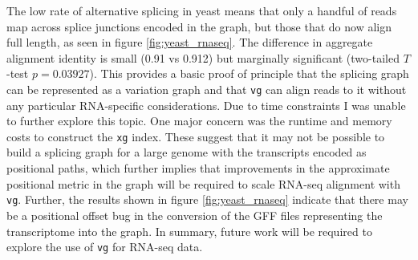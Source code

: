 The low rate of alternative splicing in yeast means that only a handful of reads map across splice junctions encoded in the graph, but those that do now align full length, as seen in figure \ref{fig:yeast_rnaseq}.
The difference in aggregate alignment identity is small (0.91 vs 0.912) but marginally significant (two-tailed $T$-test $p=0.03927$).
This provides a basic proof of principle that the splicing graph can be represented as a variation graph and that {\tt vg} can align reads to it without any particular RNA-specific considerations.
Due to time constraints I was unable to further explore this topic.
One major concern was the runtime and memory costs to construct the {\tt xg} index.
These suggest that it may not be possible to build a splicing graph for a large genome with the transcripts encoded as positional paths, which further implies that improvements in the approximate positional metric in the graph will be required to scale RNA-seq alignment with {\tt vg}.
Further, the results shown in figure \ref{fig:yeast_rnaseq} indicate that there may be a positional offset bug in the conversion of the GFF files representing the transcriptome into the graph.
In summary, future work will be required to explore the use of {\tt vg} for RNA-seq data.


